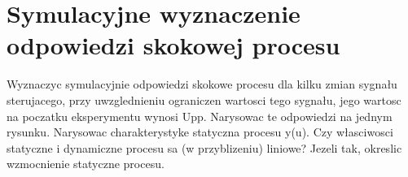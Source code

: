 \chapter{Symulacyjne wyznaczenie odpowiedzi skokowej procesu}
Wyznaczyc symulacyjnie odpowiedzi skokowe procesu dla kilku zmian sygnału sterujacego,
przy uwzglednieniu ograniczen wartosci tego sygnału, jego wartosc na poczatku
eksperymentu wynosi Upp. Narysowac te odpowiedzi na jednym rysunku. Narysowac
charakterystyke statyczna procesu y(u). Czy własciwosci statyczne i dynamiczne procesu
sa (w przyblizeniu) liniowe? Jezeli tak, okreslic wzmocnienie statyczne procesu.